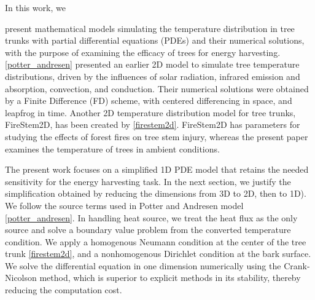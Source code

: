 \documentclass{IEEEtran} %
\newenvironment{bluep}{\par\color{blue}}{\par}
\begin{document}

In this work, we \begin{bluep}present mathematical models simulating the temperature distribution in tree trunks with partial differential equations (PDEs) and their numerical solutions, with the purpose of examining the efficacy of trees for energy harvesting. \ref{potter_andresen} presented an earlier 2D model to simulate tree temperature distributions, driven by the influences of solar radiation, infrared emission and absorption, convection, and conduction. Their numerical solutions were obtained by a Finite Difference (FD) scheme, with centered differencing in space, and leapfrog in time. Another 2D temperature distribution model for tree trunks, FireStem2D, has been created by \ref{firestem2d}. FireStem2D has parameters for studying the effects of forest fires on tree stem injury, whereas the present paper examines the temperature of trees in ambient conditions. 

The present work focuses on a simplified 1D PDE model that retains the needed sensitivity for the energy harvesting task.  In the next section, we justify the simplification obtained by reducing the dimensions from 3D to 2D, then to 1D). We follow the source terms used in Potter and Andresen model  \ref{potter_andresen}. In handling heat source, we treat the heat flux as the only source and solve a boundary value problem from the converted temperature condition. We apply a homogenous Neumann condition at the center of the tree trunk \ref{firestem2d}, and a nonhomogenous Dirichlet condition at the bark surface. We solve the differential equation in one dimension numerically using the Crank-Nicolson method, which is superior to explicit methods in its stability, thereby reducing the computation cost. 


\end{bluep}
\end{document}
